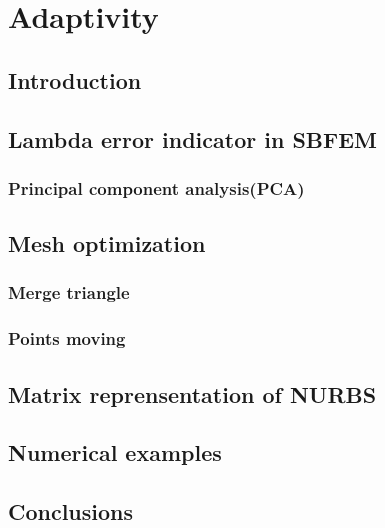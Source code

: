 
\chapter{Adaptivity}

\section{Introduction}

\section{Lambda error indicator in SBFEM}
\subsection{Principal component analysis(PCA)}

\section{Mesh optimization}

\subsection{Merge triangle}
\subsection{Points moving}

\pagebreak
\section{Matrix reprensentation of NURBS}
\label{adap_sec_mrep2d}


\section{Numerical examples}

\section{Conclusions}

